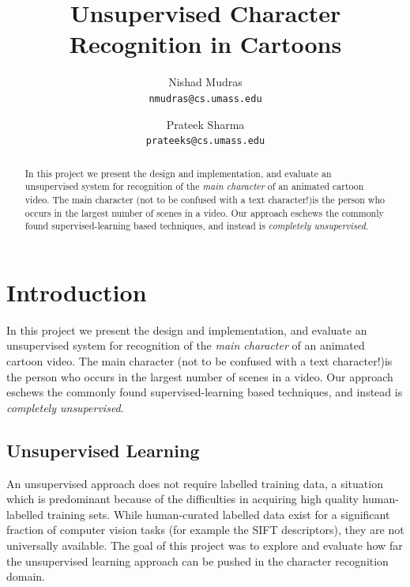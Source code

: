 \documentclass[10pt,twocolumn,letterpaper]{article}
\begin{document}
\title{Unsupervised Character Recognition in Cartoons}

\author{Nishad Mudras \\
{\tt\small nmudras@cs.umass.edu}
\and
Prateek Sharma \\
{\tt\small prateeks@cs.umass.edu}
}

\maketitle

\begin{abstract}
  In this project we present the design and implementation, and evaluate
an unsupervised system for recognition of the \emph{main character} of
an animated cartoon video. The main character (not to be confused with a
text character!)is the person who occurs in the largest number of
scenes in a video. Our approach eschews the commonly found
supervised-learning based techniques, and instead is \emph{completely
  unsupervised}.

\end{abstract}

\section{Introduction}
In this project we present the design and implementation, and evaluate
an unsupervised system for recognition of the \emph{main character} of
an animated cartoon video. The main character (not to be confused with a
text character!)is the person who occurs in the largest number of
scenes in a video. Our approach eschews the commonly found
supervised-learning based techniques, and instead is \emph{completely
  unsupervised}.


\subsection{Unsupervised Learning}

An unsupervised approach does not require labelled training data, a
situation which is predominant because of the difficulties in
acquiring high quality human-labelled training sets. While
human-curated labelled data exist for a significant fraction of
computer vision tasks (for example the SIFT descriptors), they are not
universally available. The goal of this project was to explore and
evaluate how far the unsupervised learning approach can be pushed in
the character recognition domain.
\end{document}
